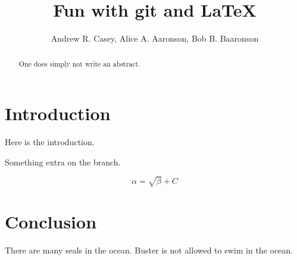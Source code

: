 \documentclass{article}
\begin{document}
\title{Fun with git and \LaTeX{}}
\author{Andrew R. Casey, Alice A. Aaronson, Bob B. Baaronson}

\maketitle

\begin{abstract}
One does simply not write an abstract.
\end{abstract}

\section{Introduction}
Here is the introduction.

Something extra on the branch.

\begin{equation}
    \label{simple_equation}
    \alpha = \sqrt{ \beta } + C
\end{equation}


\section{Conclusion}
There are many seals in the ocean. Buster is not allowed to swim in the ocean.
\end{document}
